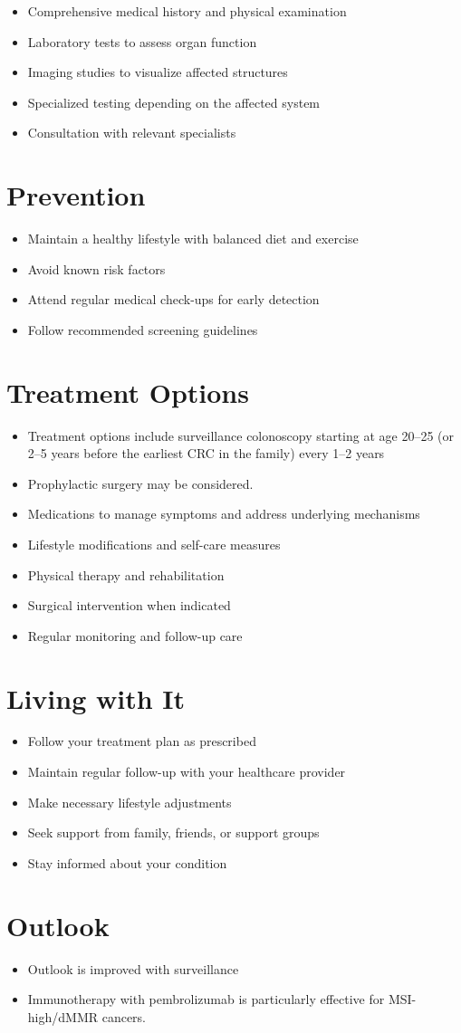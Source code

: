 \begin{itemize}[noitemsep]
  \item Comprehensive medical history and physical examination
  \item Laboratory tests to assess organ function
  \item Imaging studies to visualize affected structures
  \item Specialized testing depending on the affected system
  \item Consultation with relevant specialists
\end{itemize}
\section{Prevention}
\begin{itemize}[noitemsep]
  \item Maintain a healthy lifestyle with balanced diet and exercise
  \item Avoid known risk factors
  \item Attend regular medical check-ups for early detection
  \item Follow recommended screening guidelines
\end{itemize}
\section{Treatment Options}
\begin{itemize}[noitemsep]
  \item Treatment options include surveillance colonoscopy starting at age 20--25 (or 2--5 years before the earliest CRC in the family) every 1--2 years
  \item Prophylactic surgery may be considered.
  \item Medications to manage symptoms and address underlying mechanisms
  \item Lifestyle modifications and self-care measures
  \item Physical therapy and rehabilitation
  \item Surgical intervention when indicated
  \item Regular monitoring and follow-up care
\end{itemize}
\section{Living with It}
\begin{itemize}[noitemsep]
  \item Follow your treatment plan as prescribed
  \item Maintain regular follow-up with your healthcare provider
  \item Make necessary lifestyle adjustments
  \item Seek support from family, friends, or support groups
  \item Stay informed about your condition
\end{itemize}
\section{Outlook}
\begin{itemize}[noitemsep]
  \item Outlook is improved with surveillance
  \item Immunotherapy with pembrolizumab is particularly effective for MSI-high/dMMR cancers.
\end{itemize}
